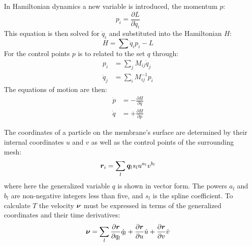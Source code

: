 In Hamiltonian dynamics a new variable is introduced, the momentum $p$:
\begin{equation}
p_i = \frac{\partial L}{\partial \dot{q}_i}
\end{equation}
This equation is then solved for $\dot{q}_i$ and substituted into the Hamiltonian $H$:
\begin{equation}
H = \sum \dot{q}_i p_i - L
\label{eq:legendre}
\end{equation}
For the control points $p$ is to related to the set $q$ through:
\begin{align}
\label{eq:pqdot}
p_i &= \sum_j{ M_{ij} \dot{q}_j } \\
\label{eq:qdotp}
\dot{q}_j &= \sum_i{ M^{-1}_{ij} p_i}
\end{align}
The equations of motion are then:
\begin{align}
\dot{p} &= - \frac{\partial H }{\partial q} \\
\dot{q} &= + \frac{\partial H }{\partial p}
\end{align} 


The coordinates of a particle on the membrane's surface are determined by their internal coordinates $u$ and $v$ as well as the control points of the surrounding mesh:
\begin{equation}
\boldsymbol{r}_i = \sum_{l} \boldsymbol{q}_l s_l u^{a_l} v^{b_l}
\end{equation}
where here the generalized variable $q$ is shown in vector form.
The powers $a_l$ and $b_l$ are non-negative integers less than five, and $s_l$ is the spline coefficient.
To calculate $T$ the velocity $\boldsymbol{\nu}$ must be expressed in terms of the generalized coordinates and their time derivatives:
\begin{equation}
\boldsymbol{\nu} =  \sum_l \frac{\partial \boldsymbol{r}}{\partial q_l} \dot{q}_l + \frac{\partial \boldsymbol{r}}{\partial u} \dot{u} +
\frac{\partial \boldsymbol{r}}{\partial v}\dot{v}
\end{equation} 

